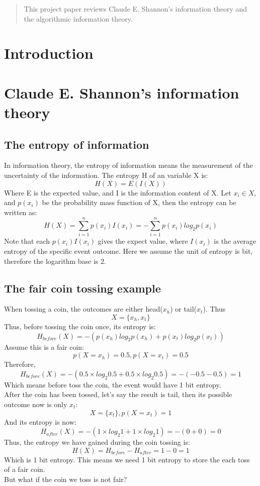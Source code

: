 \documentclass[12pt]{article}
\begin{document}
\maketitle

\begin{abstract}
This project paper reviews Claude E. Shannon's information theory and the algorithmic information theory.
\end{abstract}

\section{Introduction}

\section{Claude E. Shannon's information theory}

\subsection{The entropy of information}
In information theory, the entropy of information means the measurement of the uncertainty of the information. The entropy H of an variable X is:
\[
	H(X) = E(I(X))
\]
Where E is the expected value, and I is the information content of X.
Let $x_i \in X$, and $p(x_i)$ be the probability mass function of X, then the entropy can be written as\cite{reza94}:
\[
	H(X) = \sum_{i=1}^{n}p(x_i)I(x_i) = -\sum_{i=1}^{n}p(x_i)log_{2}p(x_i)
\]
Note that each $p(x_i)I(x_i)$ gives the expect value, where $I(x_i)$ is the average entropy of the specific event outcome. Here we assume the unit of entropy is bit, therefore the logarithm base is 2.

\subsection{The fair coin tossing example}
When tossing a coin, the outcomes are either head($x_h$) or tail($x_t$). Thus
\[
	X = \{x_h, x_t\}
\]
Thus, before tossing the coin once, its entropy is:
\[
	H_{before}(X) = -(p(x_h)log_{2}p(x_h) + p(x_t)log_{2}p(x_t))
\]
Assume this is a fair coin:
\[
	p(X=x_h) = 0.5, p(X=x_t) = 0.5
\]
Therefore,
\[
	H_{before}(X) = - (0.5 \times log_2 0.5 + 0.5 \times log_2 0.5)
		= -(-0.5-0.5) = 1
\]
Which means before toss the coin, the event would have 1 bit entropy.\\
After the coin has been tossed, let's say the result is tail, then its possible outcome now is only $x_t$:
\[
	X = \{x_t\} ,p(X=x_t) = 1
\] 
And its entropy is now:
\[
	H_{after}(X) = - (1 \times log_2 1 + 1 \times log_2 1)
		= - (0 + 0) = 0
\]
Thus, the entropy we have gained during the coin tossing is:
\[
	H(X) = H_{before} - H_{after} = 1 - 0 = 1
\]
Which is 1 bit entropy. This means we need 1 bit entropy to store the each toss of a fair coin.\\
But what if the coin we toss is not fair?
\end{document}
